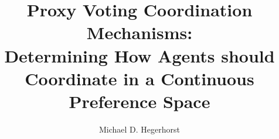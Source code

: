 \author{Michael D. Hegerhorst}
\title{
    Proxy Voting Coordination Mechanisms:\\
    Determining How Agents should Coordinate in a Continuous Preference Space
}



